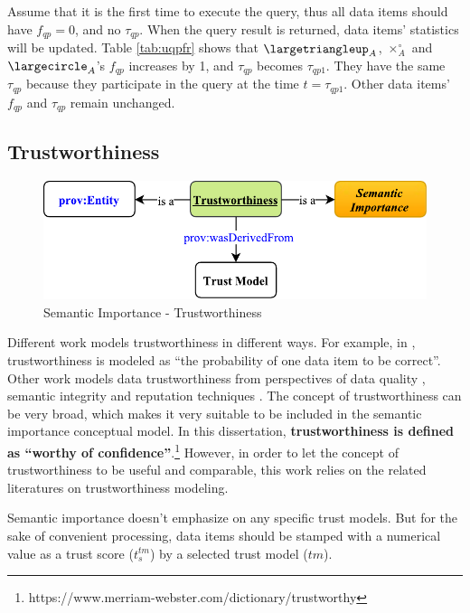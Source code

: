 Assume that it is the first time to execute the query, thus all data items should have $f_{qp} = 0$, and no $\tau_{qp}$. 
When the query result is returned, data items' statistics will be updated. 
Table \ref{tab:uqpfr} shows that $\largetriangleup_{A}$, $\times^{\circ}_{A}$ and $\largecircle_{A}$'s $f_{qp}$ increases by 1, and $\tau_{qp}$ becomes $\tau_{qp1}$.
They have the same $\tau_{qp}$ because they participate in the query at the time $t = \tau_{qp1}$. 
Other data items' $f_{qp}$ and $\tau_{qp}$ remain unchanged. 
%
\subsection{Trustworthiness}

\begin{figure}[!htbp]
	\centering
    \includegraphics[width=5in]{img/3-sit.pdf}
    \caption{Semantic Importance - Trustworthiness}
    \label{fig:3-sit}
\end{figure}

Different work models trustworthiness in different ways.
For example, in \cite{bertino2009challenge}, trustworthiness is modeled as ``the probability of one data item to be correct''. 
Other work models data trustworthiness from perspectives of data quality \cite{juran1999quality} \cite{kahn2002information} \cite{prince2004semiotic} \cite{wand1996anchoring}, semantic integrity \cite{date2004database} and reputation techniques \cite{kamvar2003eigentrust} \cite{levien2009attack}. 
The concept of trustworthiness can be very broad, which makes it very suitable to be included in the semantic importance conceptual model. 
In this dissertation, \textbf{trustworthiness is defined as ``worthy of confidence''}.\footnote{https://www.merriam-webster.com/dictionary/trustworthy}
However, in order to let the concept of trustworthiness to be useful and comparable, this work relies on the related literatures on trustworthiness modeling. 

Semantic importance doesn't emphasize on any specific trust models.
But for the sake of convenient processing, data items should be stamped with a numerical value as a trust score ($t^{tm}_{s}$) by a selected trust model ($tm$). 
%
